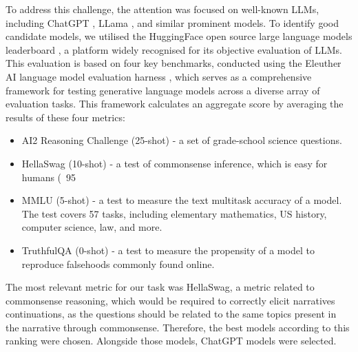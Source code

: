 To address this challenge, the attention was focused on well-known LLMs, including ChatGPT \cite{chatgpt}, LLama \cite{touvronllama}, and similar prominent models. To identify good candidate models, we utilised the HuggingFace open source large language models leaderboard \cite{huggingface-leaderboard}, a platform widely recognised for its objective evaluation of LLMs. This evaluation is based on four key benchmarks, conducted using the Eleuther AI language model evaluation harness \cite{eleuther}, which serves as a comprehensive framework for testing generative language models across a diverse array of evaluation tasks. This framework calculates an aggregate score by averaging the results of these four metrics:
\begin{itemize}
    \item {AI2 Reasoning Challenge (25-shot)} \cite{AI2} - a set of grade-school science questions.
    \item {HellaSwag (10-shot)} \cite{HellaSwag} - a test of commonsense inference, which is easy for humans (~95%
    \item {MMLU (5-shot)} \cite{MMLU} - a test to measure the text multitask accuracy of a model. The test covers 57 tasks, including elementary mathematics, US history, computer science, law, and more.
    \item {TruthfulQA (0-shot)} \cite{Truthful} - a test to measure the propensity of a model to reproduce falsehoods commonly found online.
\end{itemize}
The most relevant metric for our task was HellaSwag, a metric related to commonsense reasoning, which would be required to correctly elicit narratives continuations, as the questions should be related to the same topics present in the narrative through commonsense. Therefore, the best models according to this ranking were chosen. Alongside those models, ChatGPT models were selected. 

